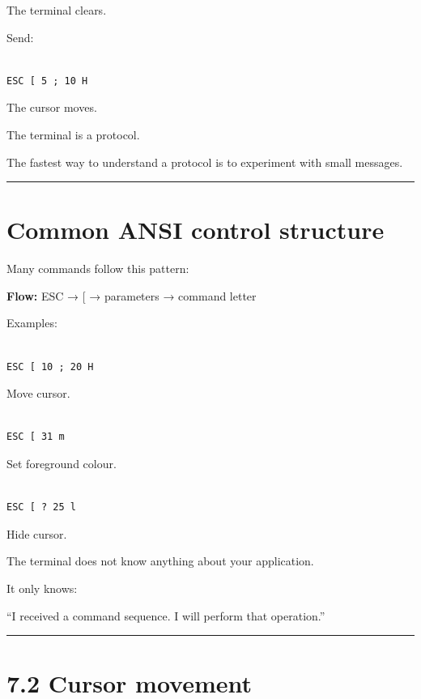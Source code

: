 \documentclass[
  oneside,
  openany]{book}
\begin{document}
The terminal clears.

Send:

\begin{verbatim}

ESC [ 5 ; 10 H
\end{verbatim}

The cursor moves.

The terminal is a protocol.

The fastest way to understand a protocol is to experiment with small
messages.

\begin{center}\rule{0.5\linewidth}{0.5pt}\end{center}

\hypertarget{common-ansi-control-structure}{%
\section{Common ANSI control
structure}\label{common-ansi-control-structure}}

Many commands follow this pattern:

\textbf{Flow:} ESC → {[} → parameters → command letter

Examples:

\begin{verbatim}

ESC [ 10 ; 20 H
\end{verbatim}

Move cursor.

\begin{verbatim}

ESC [ 31 m
\end{verbatim}

Set foreground colour.

\begin{verbatim}

ESC [ ? 25 l
\end{verbatim}

Hide cursor.

The terminal does not know anything about your application.

It only knows:

``I received a command sequence. I will perform that operation.''

\begin{center}\rule{0.5\linewidth}{0.5pt}\end{center}

\hypertarget{cursor-movement-1}{%
\section{7.2 Cursor movement}\label{cursor-movement-1}}
\end{document}
